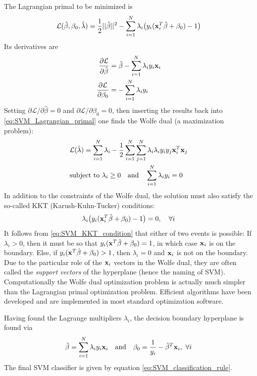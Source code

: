 \documentclass[nofootinbib,reprint,english]{revtex4-1}
\begin{document}
The Lagrangian primal to be minimized is
\begin{equation}\label{eq:SVM_Lagrangian_primal}
\mathcal{L}(\hat{\beta},\beta_0,\hat{\lambda})=\frac{1}{2}||\hat{\beta}||^2-\sum_{i=1}^N\lambda_i\big(y_i(\vb{x}_i^T\hat{\beta}+\beta_0)-1\big)
\end{equation}
Its derivatives are
\begin{subequations}
\begin{align}
\pdv{\mathcal{L}}{\hat{\beta}}&=\hat{\beta}-\sum_{i=1}^N\lambda_iy_i\vb{x}_i\\
\pdv{\mathcal{L}}{\beta_0}&=-\sum_{i=1}^N\lambda_iy_i
\end{align}
\end{subequations}
Setting \(\partial\mathcal{L}/\partial\hat{\beta}=0\) and \(\partial\mathcal{L}/\partial\beta_0=0\), then inserting the results back into \eqref{eq:SVM_Lagrangian_primal} one finds the Wolfe dual (a maximization problem):
\begin{subequations}\label{eq:SVM_Wolfe_dual}
\begin{align}
&\mathcal{L}(\hat{\lambda})=\sum_{i=1}^N\lambda_i-\frac{1}{2}\sum_{i=1}^N\sum_{j=1}^N\lambda_i\lambda_iy_iy_j\vb{x}_i^T\vb{x}_j\label{eq:SVM_Wolfe_dual_a}\\
&\text{subject to }\lambda_i\geq0\qand\sum_{i=1}^N\lambda_iy_i=0
\end{align}
\end{subequations}
In addition to the constraints of the Wolfe dual, the solution must also satisfy the so-called KKT (Karush-Kuhn-Tucker) conditions:
\begin{equation}\label{eq:SVM_KKT_condition}
\lambda_i\big(y_i(\vb{x}_i^T\hat{\beta}+\beta_0)-1\big)=0\qc\forall i
\end{equation}
It follows from \eqref{eq:SVM_KKT_condition} that either of two events is possible: If \(\lambda_i>0\), then it must be so that \(y_i(\vb{x}^T\hat{\beta}+\beta_0)=1\), in which case \(\vb{x}_i\) is on the boundary. Else, if \(y_i(\vb{x}^T\hat{\beta}+\beta_0)>1\), then \(\lambda_i=0\) and \(\vb{x}_i\) is not on the boundary. Due to the particular role of the \(\vb{x}_i\) vectors in the Wolfe dual, they are often called the \emph{support vectors} of the hyperplane (hence the naming of SVM). Computationally the Wolfe dual optimization problem is actually much simpler than the Lagrangian primal optimization problem. Efficient algorithms have been developed and are implemented in most standard optimization software.

Having found the Lagrange multipliers \(\lambda_i\), the decision boundary hyperplane is found via
\[\hat{\beta}=\sum_{i=1}^N\lambda_iy_i\vb{x}_i\qand\beta_0=\frac{1}{y_i}-\hat{\beta}^T\vb{x}_i,\ \forall i\]
The final SVM classifier is given by equation \eqref{eq:SVM_classification_rule}.
\end{document}
